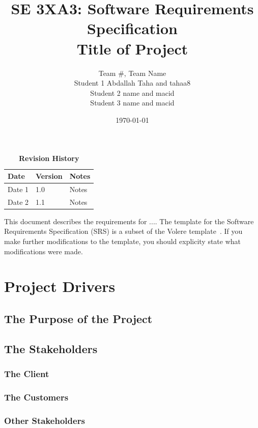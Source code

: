 \documentclass[12pt, titlepage]{article}
\title{SE 3XA3: Software Requirements Specification\\Title of Project}
\author{Team \#, Team Name
		\\ Student 1 Abdallah Taha and tahaa8
		\\ Student 2 name and macid
		\\ Student 3 name and macid
}
\date{\today}
\begin{document}
\maketitle

\tableofcontents
\listoftables
\listoffigures

\begin{table}[bp]
\caption{\bf Revision History}
\begin{tabularx}{\textwidth}{p{3cm}p{2cm}X}
\toprule {\bf Date} & {\bf Version} & {\bf Notes}\\
\midrule
Date 1 & 1.0 & Notes\\
Date 2 & 1.1 & Notes\\
\bottomrule
\end{tabularx}
\end{table}

\newpage


This document describes the requirements for ....  The template for the Software
Requirements Specification (SRS) is a subset of the Volere
template~\citep{RobertsonAndRobertson2012}.  If you make further modifications
to the template, you should explicity state what modifications were made.

\section{Project Drivers}

\subsection{The Purpose of the Project}

\subsection{The Stakeholders}

\subsubsection{The Client}

\subsubsection{The Customers}

\subsubsection{Other Stakeholders}
\end{document}
